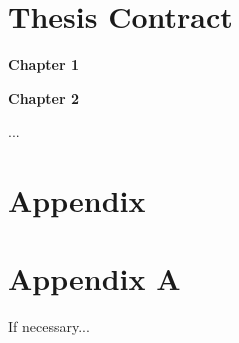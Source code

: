 \documentclass[runningheads]{llncs}
\begin{document}
\section{Thesis Contract}

\begin{todolist}
  \item \textbf{Chapter 1}
  \item \textbf{Chapter 2}
  \item ...
\end{todolist}

\section{Appendix}
\appendix
\section{Appendix A}
If necessary...

%
%
%
% 
% 
%


\end{document}
